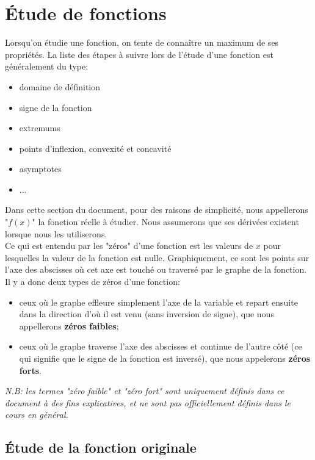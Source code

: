 \documentclass{article}
\begin{document}
\section{Étude de fonctions}
Lorsqu'on étudie une fonction, on tente de connaître un maximum de ses propriétés. La liste des étapes à suivre lors de l'étude d'une fonction est généralement du type:
\begin{itemize}
	\item domaine de définition
	\item signe de la fonction
	\item extremums
	\item points d'inflexion, convexité et concavité
	\item asymptotes
	\item ... %
\end{itemize}

Dans cette section du document, pour des raisons de simplicité, nous appellerons "\(f(x)\)" la fonction réelle à étudier. Nous assumerons que ses dérivées existent lorsque nous les utiliserons. \\
Ce qui est entendu par les "zéros" d'une fonction est les valeurs de \(x\) pour lesquelles la valeur de la fonction est nulle. Graphiquement, ce sont les points sur l'axe des abscisses où cet axe est touché ou traversé par le graphe de la fonction. \\
Il y a donc deux types de zéros d'une fonction: 
\begin{itemize}
	\item ceux où le graphe effleure simplement l'axe de la variable et repart ensuite dans la direction d'où il est venu (sans inversion de signe), que nous appellerons \textbf{zéros faibles};
	\item ceux où le graphe traverse l'axe des abscisses et continue de l'autre côté (ce qui signifie que le signe de la fonction est inversé), que nous appelerons \textbf{zéros forts}.
\end{itemize}
\emph{N.B: les termes "zéro faible" et "zéro fort" sont uniquement définis dans ce document à des fins explicatives, et ne sont pas officiellement définis dans le cours en général.}

\subsection{Étude de la fonction originale}
\end{document}
